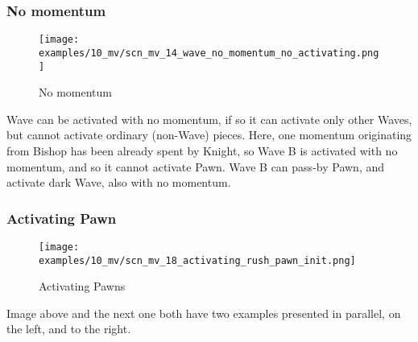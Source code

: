 
\clearpage %

\subsubsection*{No momentum}

\vspace*{-1.4\baselineskip}
\noindent
\begin{figure}[h]
\texttt{[image: examples/10\_mv/scn\_mv\_14\_wave\_no\_momentum\_no\_activating.png]}
\caption{No momentum}
\label{fig:scn_mv_14_wave_no_momentum_no_activating}
\end{figure}

Wave can be activated with no momentum, if so it can activate only other Waves, but
cannot activate ordinary (non-Wave) pieces. Here, one momentum originating from Bishop
has been already spent by Knight, so Wave B is activated with no momentum, and so it
cannot activate Pawn. Wave B can pass-by Pawn, and activate dark Wave, also with no
momentum.

\clearpage %

\subsubsection*{Activating Pawn}

\vspace*{-1.4\baselineskip}
\noindent
\begin{figure}[!h]
\texttt{[image: examples/10\_mv/scn\_mv\_18\_activating\_rush\_pawn\_init.png]}
\vspace*{-1.3\baselineskip}
\caption{Activating Pawns}
\label{fig:scn_mv_18_activating_rush_pawn_init}
\end{figure}

\vspace*{-0.3\baselineskip}
Image above and the next one both have two examples presented in parallel, on the left,
and to the right.

